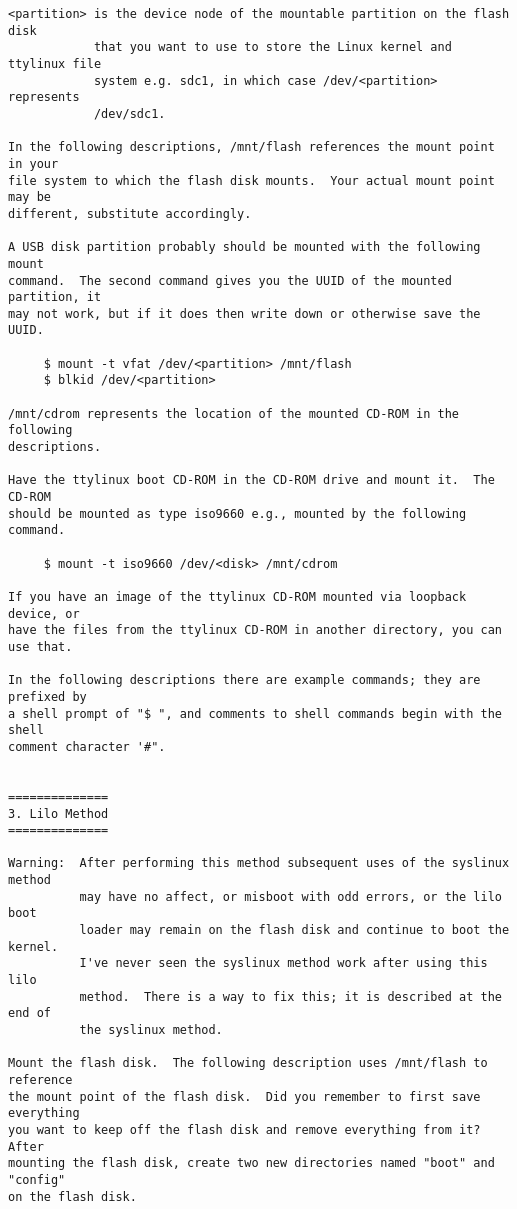 \documentclass[10pt]{article}
\begin{document}
\begin{lstlisting}
<partition> is the device node of the mountable partition on the flash disk
            that you want to use to store the Linux kernel and ttylinux file
            system e.g. sdc1, in which case /dev/<partition> represents
            /dev/sdc1.

In the following descriptions, /mnt/flash references the mount point in your
file system to which the flash disk mounts.  Your actual mount point may be
different, substitute accordingly.

A USB disk partition probably should be mounted with the following mount
command.  The second command gives you the UUID of the mounted partition, it
may not work, but if it does then write down or otherwise save the UUID.

     $ mount -t vfat /dev/<partition> /mnt/flash
     $ blkid /dev/<partition>

/mnt/cdrom represents the location of the mounted CD-ROM in the following
descriptions.

Have the ttylinux boot CD-ROM in the CD-ROM drive and mount it.  The CD-ROM
should be mounted as type iso9660 e.g., mounted by the following command.

     $ mount -t iso9660 /dev/<disk> /mnt/cdrom

If you have an image of the ttylinux CD-ROM mounted via loopback device, or
have the files from the ttylinux CD-ROM in another directory, you can use that.

In the following descriptions there are example commands; they are prefixed by
a shell prompt of "$ ", and comments to shell commands begin with the shell
comment character '#".


==============
3. Lilo Method
==============

Warning:  After performing this method subsequent uses of the syslinux method
          may have no affect, or misboot with odd errors, or the lilo boot
          loader may remain on the flash disk and continue to boot the kernel.
          I've never seen the syslinux method work after using this lilo
          method.  There is a way to fix this; it is described at the end of
          the syslinux method.

Mount the flash disk.  The following description uses /mnt/flash to reference
the mount point of the flash disk.  Did you remember to first save everything
you want to keep off the flash disk and remove everything from it?  After
mounting the flash disk, create two new directories named "boot" and "config"
on the flash disk.


\end{lstlisting}
\end{document}
